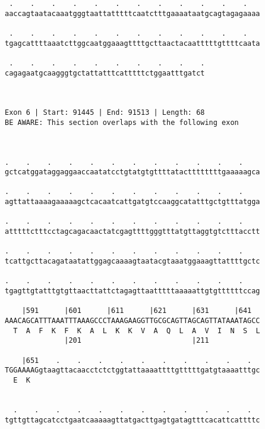 \documentclass{article}
\begin{document}
\begin{Verbatim}
 .    .    .    .    .    .    .    .    .    .    .    .   
aaccagtaatacaaatgggtaattatttttcaatctttgaaaataatgcagtagagaaaa
                                                            
 .    .    .    .    .    .    .    .    .    .    .    .   
tgagcattttaaatcttggcaatggaaagttttgcttaactacaatttttgttttcaata
                                                            
 .    .    .    .    .    .    .    .    .    .
cagagaatgcaagggtgctattatttcatttttctggaatttgatct
                                               
                                               
 
Exon 6 | Start: 91445 | End: 91513 | Length: 68
BE AWARE: This section overlaps with the following exon



.    .    .    .    .    .    .    .    .    .    .    .    
gctcatggataggaggaaccaatatcctgtatgtgttttatacttttttttgaaaaagca
                                                            
.    .    .    .    .    .    .    .    .    .    .    .    
agttattaaaagaaaaagctcacaatcattgatgtccaaggcatatttgctgtttatgga
                                                            
.    .    .    .    .    .    .    .    .    .    .    .    
atttttctttcctagcagacaactatcgagttttgggtttatgttaggtgtctttacctt
                                                            
.    .    .    .    .    .    .    .    .    .    .    .    
tcattgcttacagataatattggagcaaaagtaatacgtaaatggaaagttattttgctc
                                                            
.    .    .    .    .    .    .    .    .    .    .    .    
tgagttgtatttgtgttaacttattctagagttaatttttaaaaattgtgttttttccag
                                                            
    |591      |601      |611      |621      |631      |641  
AAACAGCATTTAAATTTAAAGCCCTAAAGAAGGTTGCGCAGTTAGCAGTTATAAATAGCC
  T  A  F  K  F  K  A  L  K  K  V  A  Q  L  A  V  I  N  S  L
              |201                          |211            
  
    |651    .    .    .    .    .    .    .    .    .    .  
TGGAAAAGgtaagttacaacctctctggtattaaaattttgtttttgatgtaaaatttgc
  E  K                                                      
                                                            
  
  .    .    .    .    .    .    .    .    .    .    .    .  
tgttgttagcatcctgaatcaaaaagttatgacttgagtgatagtttcacattcattttc
                                                            

\end{Verbatim}
\end{document}
